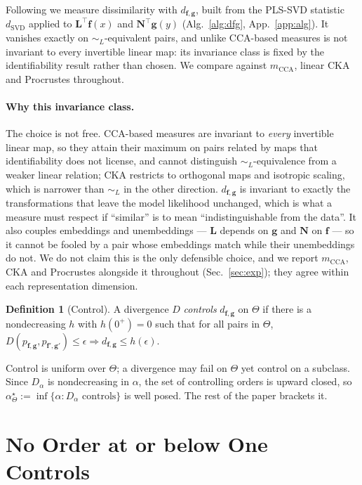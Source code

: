 \documentclass[10pt,letterpaper,twocolumn]{article}
\newcommand{\bff}{\mathbf{f}}
\newcommand{\bfg}{\mathbf{g}}
\newcommand{\bfL}{\mathbf{L}}
\newcommand{\bfN}{\mathbf{N}}
\newcommand{\dSVD}{d_{\mathrm{SVD}}}
\newcommand{\dfg}{d_{\bff,\bfg}}
\newcommand{\Dalpha}{D_{\alpha}}
\newcommand{\simL}{\sim_{L}}
\newcommand{\mCCA}{m_{\mathrm{CCA}}}
\theoremstyle{plain}
\theoremstyle{definition}
\newtheorem{definition}[theorem]{Definition}
\theoremstyle{remark}
\begin{document}
Following \citet{nielsen2025} we measure dissimilarity with $\dfg$, built from
the PLS-SVD statistic $\dSVD$ applied to $\bfL^{\top}\bff(x)$ and
$\bfN^{\top}\bfg(y)$ (Alg.~\ref{alg:dfg}, App.~\ref{app:alg}). It vanishes
exactly on $\simL$-equivalent pairs, and unlike CCA-based measures is not
invariant to every invertible linear map: its invariance class is fixed by the
identifiability result rather than chosen. We compare against $\mCCA$, linear
CKA and Procrustes throughout.

\paragraph{Why this invariance class.}
The choice is not free. CCA-based measures are invariant to \emph{every}
invertible linear map, so they attain their maximum on pairs related by maps
that identifiability does not license, and cannot distinguish
$\simL$-equivalence from a weaker linear relation; CKA restricts to orthogonal
maps and isotropic scaling, which is narrower than $\simL$ in the other
direction. $\dfg$ is invariant to exactly the transformations that leave the
model likelihood unchanged, which is what a measure must respect if
``similar'' is to mean ``indistinguishable from the data''. It also couples
embeddings and unembeddings --- $\bfL$ depends on $\bfg$ and $\bfN$ on $\bff$
--- so it cannot be fooled by a pair whose embeddings match while their
unembeddings do not. We do not claim this is the only defensible choice, and we
report $\mCCA$, CKA and Procrustes alongside it throughout
(Sec.~\ref{sec:exp}); they agree within each representation dimension.

\begin{definition}[Control]
\label{def:control}
A divergence $D$ \emph{controls} $\dfg$ on $\Theta$ if there is a
nondecreasing $h$ with $h(0^{+})=0$ such that for all pairs in $\Theta$,
$D(p_{\bff,\bfg},p_{\bff',\bfg'})\le\epsilon\Rightarrow\dfg\le h(\epsilon)$.
\end{definition}

Control is uniform over $\Theta$; a divergence may fail on $\Theta$ yet control
on a subclass. Since $\Dalpha$ is nondecreasing in $\alpha$, the set of
controlling orders is upward closed, so
$\alpha^{\star}_{\Theta}:=\inf\{\alpha:\Dalpha\text{ controls}\}$ is well posed.
The rest of the paper brackets it.

\section{No Order at or below One Controls}
\label{sec:negative}
\end{document}
